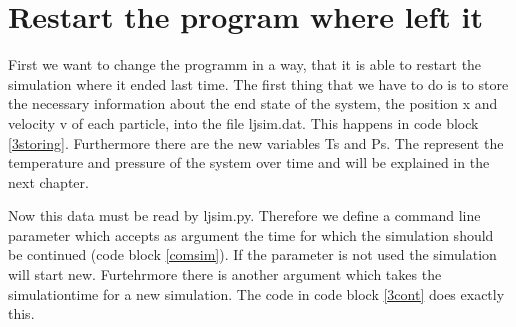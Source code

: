 \section{Restart the program where left it}

First we want to change the programm in a way, that it is able to restart the simulation where it ended last time.
The first thing that we have to do is to store the necessary information about the end state of the system, the position x and velocity v of each particle, into the file ljsim.dat. 
This happens in code block \ref{3storing}.
Furthermore there are the new variables Ts and Ps.
The represent the temperature and pressure of the system over time and will be explained in the next chapter.



Now this data must be read by ljsim.py.
Therefore we define a command line parameter  which accepts as argument the time for which the simulation should be continued (code block \ref{comsim}).
If the parameter is not used the simulation will start new.
Furtehrmore there is another argument  which takes the simulationtime for a new simulation.
The code in code block \ref{3cont} does exactly this.


